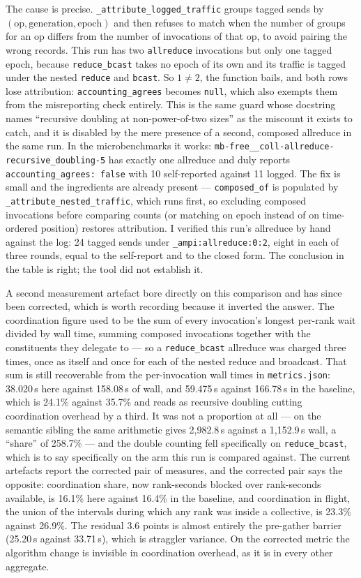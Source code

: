 \documentclass[11pt]{article}
\begin{document}
The cause is precise. \texttt{\_attribute\_logged\_traffic} groups tagged sends by
$(\text{op}, \text{generation}, \text{epoch})$ and then refuses to match when the number of groups
for an op differs from the number of invocations of that op, to avoid pairing the wrong records.
This run has two \texttt{allreduce} invocations but only one tagged epoch, because
\texttt{reduce\_bcast} takes no epoch of its own and its traffic is tagged under the nested
\texttt{reduce} and \texttt{bcast}. So $1 \neq 2$, the function bails, and both rows lose
attribution: \texttt{accounting\_agrees} becomes \texttt{null}, which also exempts them from the
misreporting check entirely. This is the same guard whose docstring names ``recursive doubling at
non-power-of-two sizes'' as the miscount it exists to catch, and it is disabled by the mere
presence of a second, composed allreduce in the same run. In the microbenchmarks it works:
\texttt{mb-free\_\_coll-allreduce-recursive\_doubling-5} has exactly one allreduce and duly
reports \texttt{accounting\_agrees: false} with 10 self-reported against 11 logged. The fix is
small and the ingredients are already present --- \texttt{composed\_of} is populated by
\texttt{\_attribute\_nested\_traffic}, which runs first, so excluding composed invocations before
comparing counts (or matching on epoch instead of on time-ordered position) restores attribution.
I verified this run's allreduce by hand against the log: 24 tagged sends under
\texttt{\_ampi:allreduce:0:2}, eight in each of three rounds, equal to the self-report and to the
closed form. The conclusion in the table is right; the tool did not establish it.

A second measurement artefact bore directly on this comparison and has since been corrected, which
is worth recording because it inverted the answer. The coordination figure used to be the sum of
every invocation's longest per-rank wait divided by wall time, summing composed invocations together
with the constituents they delegate to --- so a \texttt{reduce\_bcast} allreduce was charged three
times, once as itself and once for each of the nested reduce and broadcast. That sum is still
recoverable from the per-invocation wall times in \texttt{metrics.json}: 38.020\,s here against
158.08\,s of wall, and 59.475\,s against 166.78\,s in the baseline, which is 24.1\% against 35.7\%
and reads as recursive doubling cutting coordination overhead by a third. It was not a proportion at
all --- on the semantic sibling the same arithmetic gives 2,982.8\,s against a 1,152.9\,s wall, a
``share'' of 258.7\% --- and the double counting fell specifically on \texttt{reduce\_bcast}, which
is to say specifically on the arm this run is compared against. The current artefacts report the
corrected pair of measures, and the corrected pair says the opposite: coordination share, now
rank-seconds blocked over rank-seconds available, is 16.1\% here against 16.4\% in the baseline, and
coordination in flight, the union of the intervals during which any rank was inside a collective, is
23.3\% against 26.9\%. The residual 3.6 points is almost entirely the pre-gather barrier (25.20\,s
against 33.71\,s), which is straggler variance. On the corrected metric the algorithm change is
invisible in coordination overhead, as it is in every other aggregate.
\end{document}
